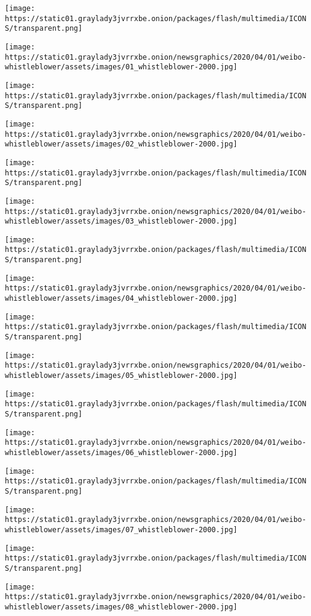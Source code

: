 \texttt{[image: https://static01.graylady3jvrrxbe.onion/packages/flash/multimedia/ICONS/transparent.png]}

\texttt{[image: https://static01.graylady3jvrrxbe.onion/newsgraphics/2020/04/01/weibo-whistleblower/assets/images/01\_whistleblower-2000.jpg]}

\texttt{[image: https://static01.graylady3jvrrxbe.onion/packages/flash/multimedia/ICONS/transparent.png]}

\texttt{[image: https://static01.graylady3jvrrxbe.onion/newsgraphics/2020/04/01/weibo-whistleblower/assets/images/02\_whistleblower-2000.jpg]}

\texttt{[image: https://static01.graylady3jvrrxbe.onion/packages/flash/multimedia/ICONS/transparent.png]}

\texttt{[image: https://static01.graylady3jvrrxbe.onion/newsgraphics/2020/04/01/weibo-whistleblower/assets/images/03\_whistleblower-2000.jpg]}

\texttt{[image: https://static01.graylady3jvrrxbe.onion/packages/flash/multimedia/ICONS/transparent.png]}

\texttt{[image: https://static01.graylady3jvrrxbe.onion/newsgraphics/2020/04/01/weibo-whistleblower/assets/images/04\_whistleblower-2000.jpg]}

\texttt{[image: https://static01.graylady3jvrrxbe.onion/packages/flash/multimedia/ICONS/transparent.png]}

\texttt{[image: https://static01.graylady3jvrrxbe.onion/newsgraphics/2020/04/01/weibo-whistleblower/assets/images/05\_whistleblower-2000.jpg]}

\texttt{[image: https://static01.graylady3jvrrxbe.onion/packages/flash/multimedia/ICONS/transparent.png]}

\texttt{[image: https://static01.graylady3jvrrxbe.onion/newsgraphics/2020/04/01/weibo-whistleblower/assets/images/06\_whistleblower-2000.jpg]}

\texttt{[image: https://static01.graylady3jvrrxbe.onion/packages/flash/multimedia/ICONS/transparent.png]}

\texttt{[image: https://static01.graylady3jvrrxbe.onion/newsgraphics/2020/04/01/weibo-whistleblower/assets/images/07\_whistleblower-2000.jpg]}

\texttt{[image: https://static01.graylady3jvrrxbe.onion/packages/flash/multimedia/ICONS/transparent.png]}

\texttt{[image: https://static01.graylady3jvrrxbe.onion/newsgraphics/2020/04/01/weibo-whistleblower/assets/images/08\_whistleblower-2000.jpg]}

